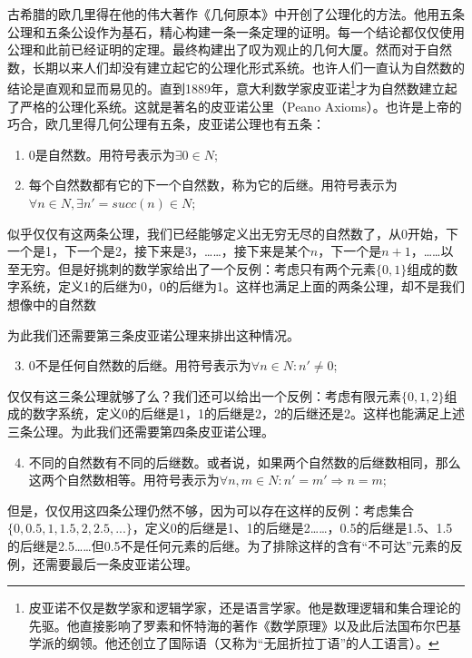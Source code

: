\documentclass[UTF8]{article}
\begin{document}
古希腊的欧几里得在他的伟大著作《几何原本》中开创了公理化的方法。他用五条公理和五条公设作为基石，精心构建一条一条定理的证明。每一个结论都仅仅使用公理和此前已经证明的定理。最终构建出了叹为观止的几何大厦。然而对于自然数，长期以来人们却没有建立起它的公理化形式系统。也许人们一直认为自然数的结论是直观和显而易见的。直到1889年，意大利数学家皮亚诺\footnote{皮亚诺不仅是数学家和逻辑学家，还是语言学家。他是数理逻辑和集合理论的先驱。他直接影响了罗素和怀特海的著作《数学原理》以及此后法国布尔巴基学派的纲领。他还创立了国际语（又称为“无屈折拉丁语”的人工语言）。}才为自然数建立起了严格的公理化系统。这就是著名的皮亚诺公里（Peano Axioms）。也许是上帝的巧合，欧几里得几何公理有五条，皮亚诺公理也有五条：


\begin{enumerate}
\item 0是自然数。用符号表示为$\exists 0 \in N$;
\item 每个自然数都有它的下一个自然数，称为它的后继。用符号表示为$\forall n \in N, \exists n' = succ(n) \in N$;
\end{enumerate}

似乎仅仅有这两条公理，我们已经能够定义出无穷无尽的自然数了，从0开始，下一个是1，下一个是2，接下来是3，……，接下来是某个$n$，下一个是$n+1$，……以至无穷。但是好挑刺的数学家给出了一个反例：考虑只有两个元素$\{0, 1\}$组成的数字系统，定义1的后继为0，0的后继为1。这样也满足上面的两条公理，却不是我们想像中的自然数

为此我们还需要第三条皮亚诺公理来排出这种情况。

\begin{enumerate}
  \setcounter{enumi}{2}
  \item 0不是任何自然数的后继。用符号表示为$\forall n \in N: n' \neq 0$;
\end{enumerate}

仅仅有这三条公理就够了么？我们还可以给出一个反例：考虑有限元素$\{0, 1, 2\}$组成的数字系统，定义0的后继是1，1的后继是2，2的后继还是2。这样也能满足上述三条公理。为此我们还需要第四条皮亚诺公理。

\begin{enumerate}
  \setcounter{enumi}{3}
  \item 不同的自然数有不同的后继数。或者说，如果两个自然数的后继数相同，那么这两个自然数相等。用符号表示为$\forall n, m \in N: n' = m' \Rightarrow n = m$;
\end{enumerate}

但是，仅仅用这四条公理仍然不够，因为可以存在这样的反例：考虑集合$\{0, 0.5, 1, 1.5, 2, 2.5, ...\}$，定义0的后继是1、1的后继是2……，0.5的后继是1.5、1.5的后继是2.5……但0.5不是任何元素的后继。为了排除这样的含有“不可达”元素的反例，还需要最后一条皮亚诺公理。
\end{document}
